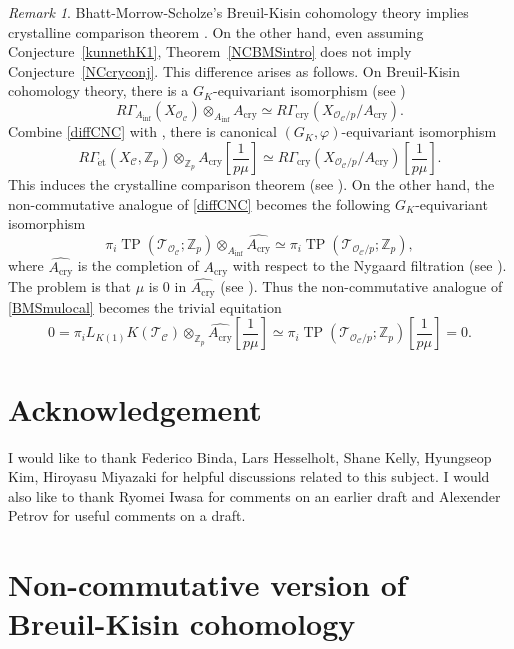 \documentclass[11pt]{amsart}
\newcommand{\Z}{\mathbb{Z}}
\newcommand{\sO}{\mathcal{O}}
\newcommand{\sT}{\mathcal{T}}
\newcommand{\cry}{\operatorname{cry}}
\newcommand{\LK}{{L_{K(1)}}}
\newcommand{\TP}{\operatorname{TP}}
\newcommand{\et}{{\operatorname{\acute{e}t}}}
\newcommand{\Acry}{A_{\operatorname{cry}}}
\newcommand{\Ainf}{A_{\operatorname{inf}}}
\newcommand{\Cu}{\mathcal{C}}
\newcounter{spec}
\theoremstyle{definition}
\theoremstyle{remark}
\newtheorem{remark}[lemma]{Remark}
\numberwithin{equation}{section}
\begin{document}
\begin{remark}
  Bhatt-Morrow-Scholze's Breuil-Kisin cohomology theory \cite[Theorem~1.2]{BMS2} implies crystalline comparison theorem \cite{Falcrys}. On the other hand, even assuming Conjecture~\ref{kunnethK1}, Theorem~\ref{NCBMSintro} does not imply Conjecture~\ref{NCcryconj}. This difference arises as follows. On Breuil-Kisin cohomology theory, there is a $G_K$-equivariant isomorphism (see \cite[Theorem 1.8 (iii)]{BMS1})
  \begin{equation}\label{diffCNC}
  R\Gamma_{\Ainf}(X_{\sO_\Cu})\otimes_{\Ainf} \Acry \simeq R\Gamma_{\cry}(X_{\sO_\Cu/p}/\Acry).
  \end{equation}
Combine \eqref{diffCNC} with \cite[Theorem~1.8 (iv)]{BMS1}, there is canonical $(G_K,\varphi)$-equivariant isomorphism 
\begin{equation}\label{BMSmulocal}
R\Gamma_{\et}(X_{\Cu},\Z_p)\otimes_{\Z_p} \Acry[\frac{1}{p\mu}] \simeq R\Gamma_{\cry}(X_{\sO_\Cu/p}/\Acry)[\frac{1}{p\mu}].
\end{equation}
This induces the crystalline comparison theorem (see \cite[Theorem 14.4]{BMS1}). On the other hand, the non-commutative analogue of \eqref{diffCNC} becomes the following $G_K$-equivariant isomorphism
 \begin{equation}\label{diffCNC2}
 \pi_i \TP(\sT_{\sO_\Cu};\Z_p)\otimes_{\Ainf} \widehat{\Acry} \simeq \pi_i\TP(\sT_{\sO_\Cu/p};\Z_p),
 \end{equation}
 where $\widehat{\Acry}$ is the completion of $\Acry$ with respect to the Nygaard filtration (see \cite[Definition 8.9]{BMS2}). The problem is that $\mu$ is $0$ in $\widehat{\Acry}$ (see \cite[Corollary 2.11 and Corollary 2.12]{remarkonK1}). Thus the non-commutative analogue of \eqref{BMSmulocal} becomes the trivial equitation
 \[
 0=\pi_i \LK K(\sT_\Cu)\otimes_{\Z_p} \widehat{\Acry}[\frac{1}{p\mu}] \simeq \pi_i\TP(\sT_{\sO_\Cu/p};\Z_p)[\frac{1}{p\mu}]=0.
 \]
\end{remark}

\section*{Acknowledgement}
I would like to thank Federico Binda, Lars Hesselholt, Shane Kelly, Hyungseop Kim, Hiroyasu Miyazaki for helpful discussions related to this subject. I would also like to thank Ryomei Iwasa for comments on an earlier draft and Alexender Petrov for useful comments on a draft.


\section{Non-commutative version of Breuil-Kisin cohomology}
\end{document}
